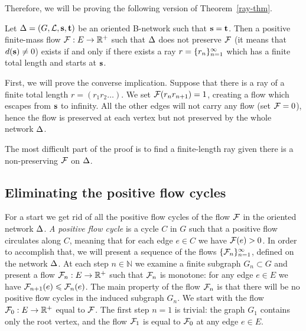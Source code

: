 \documentclass[12pt,oneside,a4paper]{amsart}
\begin{document}
      Therefore, we will be proving the following version of Theorem~\ref{ray-thm}.
      \begin{theorem}
        \label{ray-thm-reformulation}
        Let $\Delta = (G, \mathcal{L}, \mathbf{s}, \mathbf{t})$ be an oriented B-network such that $\mathbf{s} = \mathbf{t}$.
        Then a positive finite-mass flow $\mathcal{F}: E \to \mathbb{R}^{+}$ such that
          $\Delta$ does not preserve $\mathcal{F}$ (it means that $d(\mathbf{s}) \neq 0$)
          exists if and only if there exists a ray $r = \{{r}_n\}_{n=1}^\infty$
          which has a finite total length and starts at $\mathbf{s}$.
      \end{theorem}
      First, we will prove the converse implication.
      Suppose that there is a ray of a finite total length $r=(r_1 r_2 \dots)$.
      We set $\mathcal{F}(r_n r_{n+1}) = 1$, creating a flow which escapes
        from $\mathbf{s}$ to infinity.
      All the other edges will not carry any flow (set $\mathcal{F} = 0$), hence the flow is preserved
        at each vertex but not preserved by the whole network $\Delta$.

      The most difficult part of the proof is to find a finite-length ray
        given there is a non-preserving $\mathcal{F}$ on $\Delta$.

      \medskip
      \subsection{Eliminating the positive flow cycles}
        For a start we get rid of all the positive flow cycles of the flow $\mathcal{F}$ in the oriented network $\Delta$.
        \emph{A positive flow cycle} is a cycle $C$ in $G$ such that a positive flow circulates along $C$,
          meaning that for each edge $e \in C$ we have $\mathcal{F}(e) > 0$.
        In order to accomplish that, we will present a sequence of the flows $\{{\mathcal{F}}_n\}_{n=1}^\infty$,
          defined on the network $\Delta$.
        At each step $n \in \mathbb{N}$ we examine a finite subgraph $G_n \subset G$ and present a flow $\mathcal{F}_{n}: E \to \mathbb{R}^{+}$
          such that $\mathcal{F}_{n}$ is monotone: for any edge $e \in E$ we have $\mathcal{F}_{n+1}(e) \leqslant \mathcal{F}_{n}(e)$.
        The main property of the flow $\mathcal{F}_{n}$ is that there will be no positive flow cycles in the induced subgraph
        $G_n$.
        We start with the flow $\mathcal{F}_{0}:E \to \mathbb{R}^+$ equal to $\mathcal{F}$.
        The first step $n = 1$ is trivial: the graph $G_1$ contains only the root vertex, and
          the flow $\mathcal{F}_{1}$ is equal to $\mathcal{F}_{0}$ at any edge $e \in E$.
\end{document}
